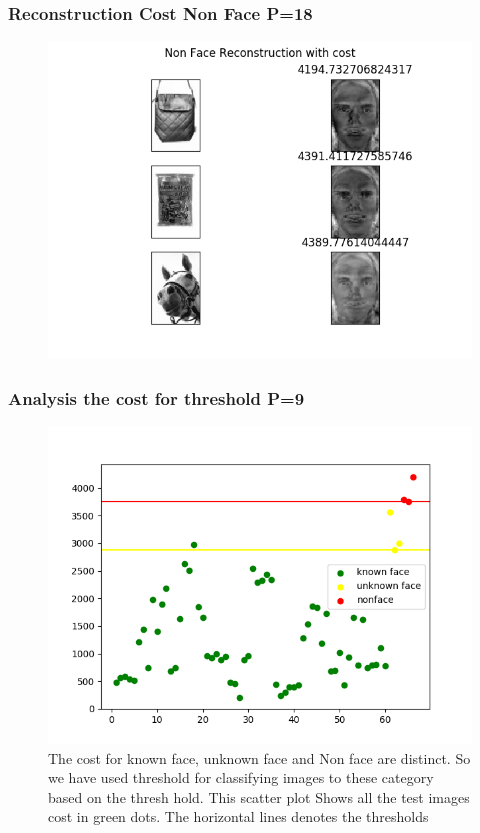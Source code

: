 \documentclass[11pt]{beamer}
\begin{document}
\begin{frame}
\frametitle{Reconstruction Cost Non Face P=18}
\begin{figure}
\includegraphics[width=.95\textwidth]{Non_Face_cost_P_18.png}
\end{figure}
\end{frame}

\begin{frame}
\frametitle{Analysis the cost for threshold P=9}
\begin{figure}
\includegraphics[width=.7\textwidth]{thresholds_9.png}
\caption{The cost for known face, unknown face and Non face are distinct. 
So we have used threshold for classifying images to these category based on the thresh hold. 
This scatter plot Shows all the test images cost in green dots. The horizontal lines denotes the thresholds}
\end{figure}
\end{frame}
\end{document}
